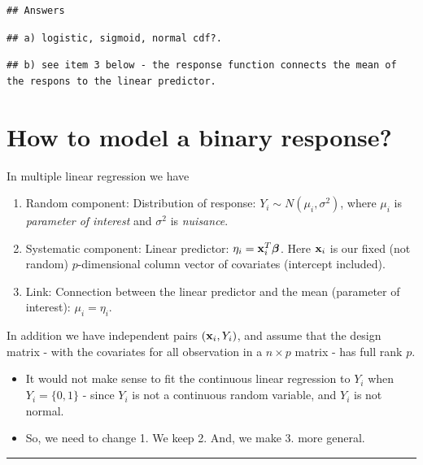 \documentclass[
]{article}
\providecommand{\tightlist}{%
  \setlength{\itemsep}{0pt}\setlength{\parskip}{0pt}}
\begin{document}
\begin{verbatim}
## Answers
\end{verbatim}

\begin{verbatim}
## a) logistic, sigmoid, normal cdf?.
\end{verbatim}

\begin{verbatim}
## b) see item 3 below - the response function connects the mean of the respons to the linear predictor.
\end{verbatim}

\hypertarget{how-to-model-a-binary-response}{%
\section{How to model a binary
response?}\label{how-to-model-a-binary-response}}

In multiple linear regression we have

\begin{enumerate}
\def\labelenumi{\arabic{enumi}.}
\item
  Random component: Distribution of response:
  \(Y_i\sim N(\mu_i,\sigma^2)\), where \(\mu_i\) is \emph{parameter of
  interest} and \(\sigma^2\) is \emph{nuisance}.
\item
  Systematic component: Linear predictor:
  \(\eta_i={\bf x}_i^T \boldsymbol{\beta}\). Here \({\bf x}_i\) is our
  fixed (not random) \(p\)-dimensional column vector of covariates
  (intercept included).
\item
  Link: Connection between the linear predictor and the mean (parameter
  of interest): \(\mu_i=\eta_i\).
\end{enumerate}

In addition we have independent pairs \(({\bf x}_i,Y_i)\), and assume
that the design matrix - with the covariates for all observation in a
\(n \times p\) matrix - has full rank \(p\).

\begin{itemize}
\tightlist
\item
  It would not make sense to fit the continuous linear regression to
  \(Y_i\) when \(Y_i=\{0,1\}\) - since \(Y_i\) is not a continuous
  random variable, and \(Y_i\) is not normal.
\item
  So, we need to change 1. We keep 2. And, we make 3. more general.
\end{itemize}

\begin{center}\rule{0.5\linewidth}{0.5pt}\end{center}
\end{document}
